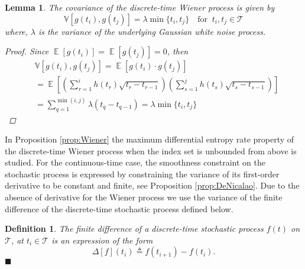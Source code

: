 \documentclass{article}
\newtheorem{mydef}{Definition}
\newtheorem{lem}{Lemma}
\newcommand{\E}{\mathop{\mathbb E}}
\begin{document}
\begin{lem}
\label{lem:covWiener}
The covariance of the discrete-time Wiener process is given by
\begin{equation}
\mathbb{V}[g(t_i),g(t_j)]=\lambda \min\{t_i,t_j\}\ \ \   \text{ for } \ t_i,t_j \in \mathcal{T}
\end{equation}
where, $\lambda$ is the variance of the underlying Gaussian white noise process.
\begin{proof} Since $\E[g(t_i)]=\E[g(t_j)]=0$, then 
\begin{align}
&\mathbb{V}\left[g(t_i),g(t_j)\right]=\E\left[g(t_i)\cdot g(t_j)\right]\nonumber\\
&=\E\left[\left(\sum_{r=1}^{i}{h(t_r)\sqrt{t_r-t_{r-1}}}\right)\left(\sum_{s=1}^{j}{h(t_s)\sqrt{t_s-t_{s-1}}}\right)\right]\nonumber\\
&=\sum_{q=1}^{\min(i,j)}{\lambda({t_q-t_{q-1}})}=\lambda \min\{t_i,t_j\}
\end{align}
\end{proof}
\end{lem}
In Proposition \ref{prop:Wiener} the maximum differential entropy
rate property of the discrete-time Wiener process when the index set is unbounded from above is studied. For
the continuous-time case, the smoothness constraint on the
stochastic process is expressed by constraining  the variance of its
first-order derivative  to be constant and finite, see Proposition
\ref{prop:DeNicalao}. Due to the absence of derivative for the
Wiener process we use the variance of the finite difference of the
discrete-time stochastic process defined below.
\begin{mydef} The finite difference of a discrete-time stochastic process $f(t)$ on $\mathcal{T} $, at $t_i\in\mathcal{T}$ is an expression of the form
\begin{equation}
\Delta [f] (t_i) \triangleq f(t_{i+1})-f(t_{i}).
\end{equation}
\hfill $\blacksquare$
\end{mydef}
\end{document}
